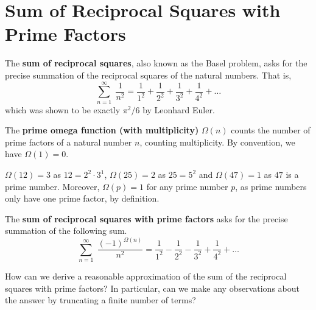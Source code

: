 
\section{Sum of Reciprocal Squares with Prime Factors}

\begin{definition}
	The \textbf{sum of reciprocal squares}, also known as the Basel problem, asks for the precise summation of the reciprocal squares of the natural numbers. That is,
	$$\sum_{n=1}^\infty \; \frac{1}{n^2} = \frac{1}{1^2} + \frac{1}{2^2} + \frac{1}{3^2} + \frac{1}{4^2} + \dots$$
	which was shown to be exactly $\pi^2/6$ by Leonhard Euler.
\end{definition}

\begin{definition}
	The \textbf{prime omega function (with multiplicity)} $\Omega(n)$ counts the number of prime factors of a natural number $n$, counting multiplicity. By convention, we have $\Omega(1) = 0$.
\end{definition}

\begin{example}
	$\Omega(12) = 3$ as $12 = 2^2 \cdot 3^1$, $\Omega(25) = 2$ as $25 = 5^2$ and $\Omega(47) = 1$ as $47$ is a prime number. Moreover, $\Omega(p) = 1$ for any prime number $p$, as prime numbers only have one prime factor, by definition.
\end{example}

\begin{definition}
	The \textbf{sum of reciprocal squares with prime factors} asks for the precise summation of the following sum.
	$$\sum_{n=1}^\infty \; \frac{(-1)^{\Omega(n)}}{n^2} = \frac{1}{1^2} - \frac{1}{2^2} - \frac{1}{3^2} + \frac{1}{4^2} + \dots$$
\end{definition}

\begin{problem}
	How can we derive a reasonable approximation of the sum of the reciprocal squares with prime factors? In particular, can we make any observations about the answer by truncating a finite number of terms?
\end{problem}



